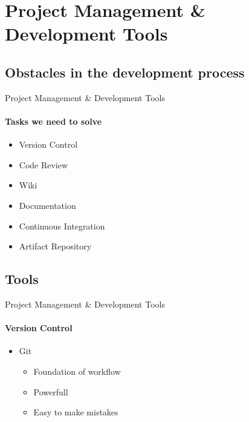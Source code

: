 \section{Project Management \& Development Tools}
    \subsection{Obstacles in the development process}
    \begin{frame}[t]{Project Management \& Development Tools}\framesubtitle{Tasks we need to solve}
        \begin{itemize}
        	\item Version Control
        	\item Code Review
        	\item Wiki
        	\item Documentation
        	\item Continuous Integration
        	\item Artifact Repository
        \end{itemize}
    \end{frame}
    \subsection{Tools}
    \begin{frame}[t]{Project Management \& Development Tools}\framesubtitle{Version Control}
        \begin{itemize}
            \item Git
        	\begin{itemize}
        		\item Foundation of workflow
                \item Powerfull
                \item Easy to make mistakes
        	\end{itemize}
        \end{itemize}
    \end{frame}

